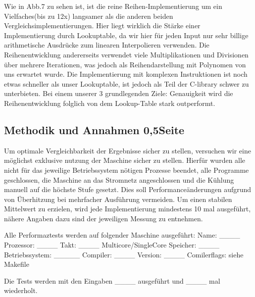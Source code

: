\documentclass[course=erap] {aspdoc}
\begin{document}

    Wie in Abb.7 zu sehen ist, ist die reine Reihen-Implementierung um ein Vielfaches(bis zu 12x) langsamer als die anderen
    beiden Vergleichsimplementierungen. Hier liegt wirklich die Stärke einer Implementierung durch Lookuptable, da wir hier für jeden
    Input nur sehr billige arithmetische Ausdrücke zum linearen Interpolieren verwenden. Die Reihenentwicklung andererseits verwendet 
    viele Multiplikationen und Divisionen über mehrere Iterationen, was jedoch als Reihendarstellung mit Polynomen von uns erwartet
    wurde. Die Implementierung mit komplexen Instruktionen ist noch etwas schneller als unser Lookuptable, ist jedoch als Teil der 
    C-library schwer zu unterbieten. Bei einem unserer 3 grundlegenden Ziele: Genauigkeit wird die Reihenentwicklung folglich von dem
    Lookup-Table stark outperformt. 

    \subsection{Methodik und Annahmen 0,5Seite}
    Um optimale Vergleichbarkeit der Ergebnisse sicher zu stellen, versuchen wir eine möglichst exklusive nutzung der Maschine sicher zu stellen.
    Hierfür wurden alle nicht für das jeweilige Betriebssystem nötigen Prozesse beendet, alle Programme geschlossen, die Maschine an das Stromnetz angeschlossen und die Kühlung manuell auf die höchste Stufe gesetzt.
    Dies soll Performanceänderungen aufgrund von Überhitzung bei mehrfacher Ausführung vermeiden.
    Um einen stabilen Mittelwert zu erzielen, wird jede Implementierung mindestens 10 mal ausgeführt, nähere Angaben dazu sind der jeweiligen Messung zu entnehmen.

    Alle Performaztests werden auf folgender Maschine ausgeführt: Name: ____ Prozessor: ____ Takt: ____ Multicore/SingleCore Speicher: ____ Betriebssystem: _____ Compiler: ____ Version: ____ Comilerflags: siehe Makefile

    Die Tests werden mit den Eingaben ____ ausgeführt und ____ mal wiederholt.
\end{document}
